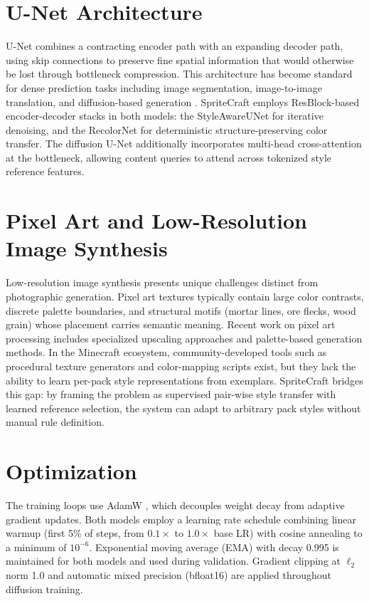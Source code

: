 \section{U-Net Architecture}

U-Net \citep{ronneberger2015unet} combines a contracting encoder path with an expanding decoder path, using skip connections to preserve fine spatial information that would otherwise be lost through bottleneck compression. This architecture has become standard for dense prediction tasks including image segmentation, image-to-image translation, and diffusion-based generation \citep{dhariwal2021diffusion}. SpriteCraft employs ResBlock-based \citep{he2016deep} encoder-decoder stacks in both models: the StyleAwareUNet for iterative denoising, and the RecolorNet for deterministic structure-preserving color transfer. The diffusion U-Net additionally incorporates multi-head cross-attention \citep{vaswani2017attention} at the bottleneck, allowing content queries to attend across tokenized style reference features.

\section{Pixel Art and Low-Resolution Image Synthesis}

Low-resolution image synthesis presents unique challenges distinct from photographic generation. Pixel art textures typically contain large color contrasts, discrete palette boundaries, and structural motifs (mortar lines, ore flecks, wood grain) whose placement carries semantic meaning. Recent work on pixel art processing includes specialized upscaling approaches \citep{hou2021coordinates} and palette-based generation methods. In the Minecraft ecosystem, community-developed tools such as procedural texture generators and color-mapping scripts exist, but they lack the ability to learn per-pack style representations from exemplars. SpriteCraft bridges this gap: by framing the problem as supervised pair-wise style transfer with learned reference selection, the system can adapt to arbitrary pack styles without manual rule definition.

\section{Optimization}

The training loops use AdamW \citep{loshchilov2019decoupled}, which decouples weight decay from adaptive gradient updates. Both models employ a learning rate schedule combining linear warmup (first 5\% of steps, from $0.1\times$ to $1.0\times$ base LR) with cosine annealing to a minimum of $10^{-6}$. Exponential moving average (EMA) with decay 0.995 is maintained for both models and used during validation. Gradient clipping at $\ell_2$ norm 1.0 and automatic mixed precision (bfloat16) are applied throughout diffusion training.
